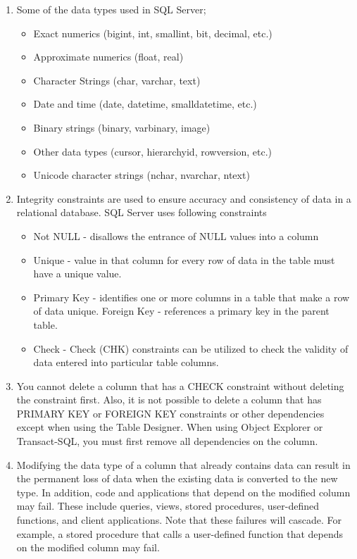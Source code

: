 \documentclass[12pt]{article}
\begin{document}
\begin{enumerate}
\begin{itemize}
                \end{itemize}
                \item Some of the data types used in SQL Server;
                \begin{itemize}                   
                        \item Exact numerics (bigint, int, smallint, bit, decimal, etc.)
                        \item Approximate numerics (float, real)
                        \item Character Strings (char, varchar, text)
                        \item Date and time (date, datetime, smalldatetime, etc.)
                        \item Binary strings (binary, varbinary, image)
                        \item Other data types (cursor, hierarchyid, rowversion, etc.)
                        \item Unicode character strings (nchar, nvarchar, ntext)
                \end{itemize}
                \item Integrity constraints are used to ensure accuracy and consistency of data in a relational database. SQL Server uses following constraints
                \begin{itemize}                       
                        \item Not NULL - disallows the entrance of NULL values into a column
                        \item Unique - value in that column for every row of data in the table must have a unique value.
                        \item Primary Key - identifies one or more columns in a table that make a row of data unique.
                        Foreign Key - references a primary key in the parent table.
                        \item Check - Check (CHK) constraints can be utilized to check the validity of data entered into particular table columns.
                \end{itemize}
                \item You cannot delete a column that has a CHECK constraint without deleting the constraint first. Also, it is not possible to delete a column that has PRIMARY KEY or FOREIGN KEY constraints or other dependencies except when using the Table Designer. When using Object Explorer or Transact-SQL, you must first remove all dependencies on the column.
                \item Modifying the data type of a column that already contains data can result in the permanent loss of data when the existing data is converted to the new type. In addition, code and applications that depend on the modified column may fail. These include queries, views, stored procedures, user-defined functions, and client applications. Note that these failures will cascade. For example, a stored procedure that calls a user-defined function that depends on the modified column may fail.
        \end{enumerate}
\end{document}
